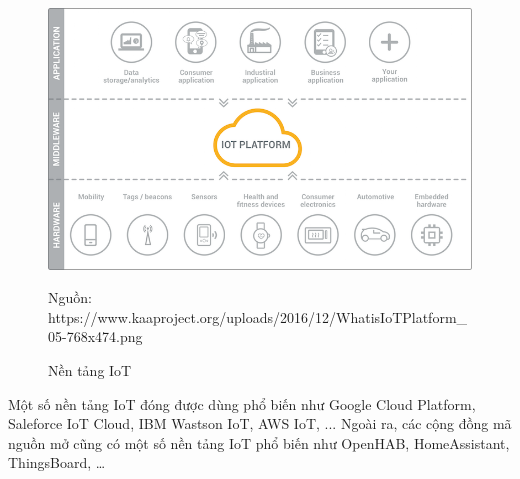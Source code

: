 \begin{figure}[h!]
	\center
	\includegraphics[scale=0.6]{image/IoTPlatform}
	\caption{Nền tảng IoT}
	Nguồn: https://www.kaaproject.org/uploads/2016/12/WhatisIoTPlatform\_05-768x474.png
	\label{fig:iot-platform}
\end{figure}


Một số nền tảng IoT đóng được dùng phổ biến như Google Cloud Platform, Saleforce IoT Cloud, IBM Wastson IoT, AWS IoT, ... Ngoài ra, các cộng đồng mã nguồn mở cũng có một số nền tảng IoT phổ biến như OpenHAB, HomeAssistant, ThingsBoard, …



